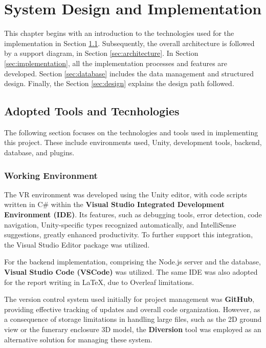 
%
\chapter{System Design and Implementation}
\label{cha:system_implementation}
This chapter begins with an introduction to the technologies used for the implementation in Section \ref{sec:tools}.
Subsequently, the overall architecture is followed by a support diagram, in Section \ref{sec:architecture}.
In Section \ref{sec:implementation}, all the implementation processes and features are developed.
Section \ref{sec:database} includes the data management and structured design.
Finally, the Section \ref{sec:design} explains the design path followed.

\section{Adopted Tools and Tecnhologies}
\label{sec:tools}
The following section focuses on the technologies and tools used in implementing this project. 
These include environments used, Unity, development tools, backend, database, and plugins.

\subsection{Working Environment}

The  \gls{VR} environment was developed using the Unity editor, with code scripts written in C\# within the \textbf{Visual Studio Integrated Development Environment (IDE)}.
Its features, such as debugging tools, error detection, code navigation, Unity-specific types recognized automatically, and IntelliSense suggestions, greatly enhanced productivity. 
To further support this integration, the Visual Studio Editor package was utilized. 

For the backend implementation, comprising the Node.js server and the database, \textbf{Visual Studio Code (VSCode)} was utilized. 
The same IDE was also adopted for the report writing in LaTeX, due to Overleaf limitations.

The version control system used initially for project management was \textbf{GitHub}, providing effective tracking of updates and overall code organization.
However, as a consequence of storage limitations in handling large files, such as the \gls{2D} ground view or the funerary enclosure \gls{3D} model, the \textbf{Diversion} tool was employed as an alternative solution for managing these system.

